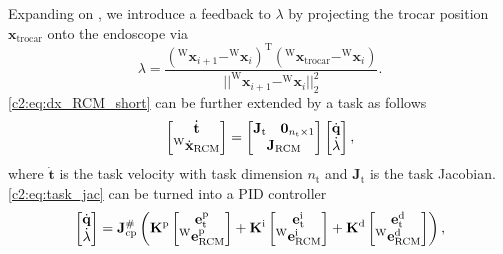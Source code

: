 Expanding on \cite{aghakhani2013task}, we introduce a feedback to $\lambda$ by projecting the trocar position $\mathbf{x}_\text{trocar}$ onto the endoscope via
\begin{equation}
    \lambda = \frac{(^\text{W}\mathbf{x}_{i+1} - ^\text{W}\mathbf{x}_i)^\text{T}(^\text{W}\mathbf{x}_\text{trocar}-^\text{W}\mathbf{x}_i)}{||^\text{W}\mathbf{x}_{i+1}-^\text{W}\mathbf{x}_i||_2^2}.
\end{equation}
\eqref{c2:eq:dx_RCM_short} can be further extended by a task as follows
\begin{equation}
    \begin{bmatrix}\dot{\mathbf{t}} \\ ^\text{W}\dot{\mathbf{x}}_\text{RCM}\end{bmatrix} =
    \begin{bmatrix}\mathbf{J}_\text{t} & \mathbf{0}_{n_\text{t}\times 1} \\ \multicolumn{2}{c}{\mathbf{J}_\text{RCM}}
    \end{bmatrix}
    \begin{bmatrix}\dot{\mathbf{q}}\\\dot{\lambda}\end{bmatrix},
    \label{c2:eq:task_jac}
\end{equation}
where $\dot{\mathbf{t}}$ is the task velocity with task dimension $n_\text{t}$ and $\mathbf{J}_\text{t}$ is the task Jacobian. \eqref{c2:eq:task_jac} can be turned into a PID controller
\begin{equation}
    \centering
    \begin{bmatrix}
        \dot{\mathbf{q}}\\
        \dot{\lambda}
    \end{bmatrix} = 
    \mathbf{J}_\text{cp}^\#
    \left(
        \mathbf{K}^\text{p}
        \begin{bmatrix}
            \mathbf{e}_\text{t}^\text{p}\\
            ^\text{W}\mathbf{e}_\text{RCM}^\text{p}
        \end{bmatrix} +
        \mathbf{K}^\text{i}
        \begin{bmatrix}
            \mathbf{e}_\text{t}^\text{i}\\
            ^\text{W}\mathbf{e}_\text{RCM}^\text{i}
        \end{bmatrix} +
        \mathbf{K}^\text{d}
        \begin{bmatrix}
            \mathbf{e}_\text{t}^\text{d}\\
            ^\text{W}\mathbf{e}_\text{RCM}^\text{d}
        \end{bmatrix}
    \right),
    \label{c2:eq:pid}
\end{equation}

